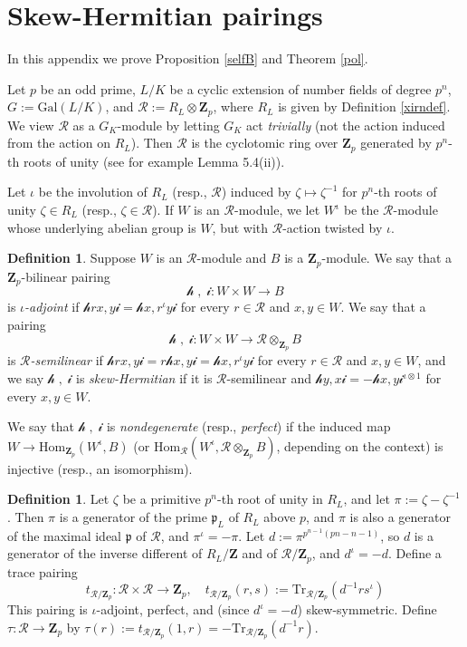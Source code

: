 \documentclass[reqno]{amsart}
\theoremstyle{definition}
\newtheorem{defn}[thm]{Definition}
\def\Z{\mathbf{Z}}
\def\Zp{\Z_p}
\def\cR{\mathcal{R}}
\def\T{W}
\def\ld{\mathcal{h}}
\def\rd{\mathcal{i}}
\def\P{\mathfrak{p}}
\def\Hom{\mathrm{Hom}}
\def\Gal{\mathrm{Gal}}
\def\Tr{\mathrm{Tr}}
\def\pair#1#2{\ld#1,#2\rd}
\begin{document}
\appendix

\section{Skew-Hermitian pairings}
\label{la}
\label{polpf}

In this appendix we prove Proposition \ref{selfB} and Theorem \ref{pol}.

Let $p$ be an odd prime, 
$L/K$ be a cyclic extension of number fields of degree $p^n$, 
$G := \Gal(L/K)$, and $\cR := R_L \otimes \Zp$, where $R_L$ is given 
by Definition \ref{xirndef}.  
We view $\cR$ as a $G_K$-module by letting $G_K$ act 
{\em trivially} (not the action induced from the action on $R_L$).  
Then $\cR$ is the cyclotomic ring over $\Zp$ generated by $p^n$-th 
roots of unity (see for example \cite{prim} Lemma 5.4(ii)).  

Let $\iota$ be the involution of $R_L$ (resp., $\cR$) 
induced by $\zeta \mapsto \zeta^{-1}$ for $p^n$-th roots of unity 
$\zeta \in R_L$ (resp., $\zeta \in \cR$).
If $\T$ is an $\cR$-module, we let $\T^\iota$ be the $\cR$-module 
whose underlying abelian group is $\T$, but with $\cR$-action 
twisted by $\iota$.  

\begin{defn}
\label{shdef}
Suppose $\T$ is an $\cR$-module and $B$ is a $\Zp$-module.  We say that 
a $\Zp$-bilinear pairing  
$$\pair{\;}{\;} : \T \times \T \to B$$ 
is {\em $\iota$-adjoint} 
if $\pair{rx}{y} = \pair{x}{r^\iota y}$ for every $r \in \cR$ and $x,y \in \T$.
We say that a pairing  
$$\pair{\;}{\;} : \T \times \T \to \cR \otimes_{\Zp} B$$ 
is {\em $\cR$-semilinear} if 
$\pair{rx}{y} = r\pair{x}{y} = \pair{x}{r^\iota y}$ for every 
$r \in \cR$ and $x, y \in \T$,
and we say $\pair{\;}{\;}$ is {\em skew-Hermitian} if it is $\cR$-semilinear and 
$\pair{y}{x} = -\pair{x}{y}^{\iota \otimes 1}$ for every $x, y \in \T$.

We say that $\pair{\;}{\;}$ is {\em nondegenerate} (resp., {\em perfect}) 
if the induced map $\T \to \Hom_{\Zp}(\T^\iota,B)$ 
(or $\Hom_\cR(\T^\iota,\cR \otimes_{\Zp} B)$, 
depending on the context) is injective (resp., an isomorphism).
\end{defn}

\begin{defn}
\label{pdefs}
Let $\zeta$ be a primitive $p^n$-th root of unity in 
$R_L$, and let $\pi := \zeta-\zeta^{-1}$.  Then $\pi$ is a generator 
of the prime $\P_L$ of $R_L$ above $p$, and $\pi$ is also a generator of 
the maximal ideal $\P$ of $\cR$, and $\pi^\iota = -\pi$.
Let $d := \pi^{p^{n-1}(pn-n-1)}$, so $d$ is a generator of 
the inverse different of $R_L/\Z$ and of $\cR/\Zp$, and $d^\iota = -d$.  
Define a trace pairing
$$
t_{\cR/\Zp} : \cR \times \cR \to \Zp, 
    \quad t_{\cR/\Zp}(r,s) := \Tr_{\cR/\Zp}(d^{-1} r s^\iota)
$$
This pairing is $\iota$-adjoint, perfect, and (since $d^\iota = -d$) 
skew-symmetric.  
Define $\tau : \cR \to \Zp$ by 
$
\tau(r) := t_{\cR/\Zp}(1,r) = -\Tr_{\cR/\Zp}(d^{-1}r).
$
\end{defn}
\end{document}
